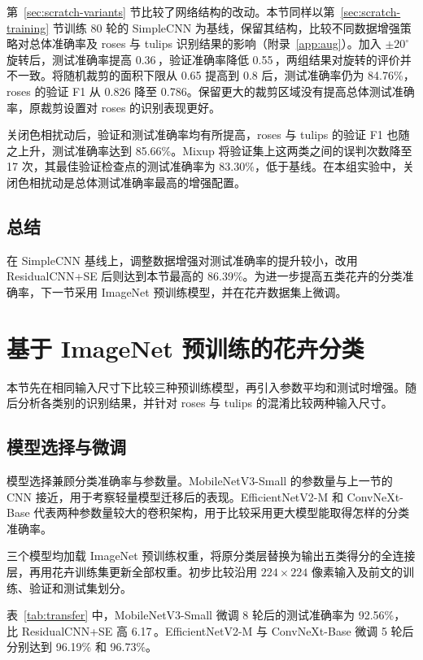 \documentclass[11pt,a4paper,UTF8,fontset=windows]{ctexart}
\newcommand{\pp}{\,\text{pp}}
\begin{document}
第~\ref{sec:scratch-variants} 节比较了网络结构的改动。本节同样以第~\ref{sec:scratch-training} 节训练 80 轮的 SimpleCNN 为基线，保留其结构，比较不同数据增强策略对总体准确率及 roses 与 tulips 识别结果的影响（附录~\ref{app:aug}）。加入 $\pm20^\circ$ 旋转后，测试准确率提高 0.36\pp，验证准确率降低 0.55\pp，两组结果对旋转的评价并不一致。将随机裁剪的面积下限从 0.65 提高到 0.8 后，测试准确率仍为 84.76\%，roses 的验证 F1 从 0.826 降至 0.786。保留更大的裁剪区域没有提高总体测试准确率，原裁剪设置对 roses 的识别表现更好。

关闭色相扰动后，验证和测试准确率均有所提高，roses 与 tulips 的验证 F1 也随之上升，测试准确率达到 85.66\%。Mixup 将验证集上这两类之间的误判次数降至 17 次，其最佳验证检查点的测试准确率为 83.30\%，低于基线。在本组实验中，关闭色相扰动是总体测试准确率最高的增强配置。

\subsection{总结}

在 SimpleCNN 基线上，调整数据增强对测试准确率的提升较小，改用 ResidualCNN+SE 后则达到本节最高的 86.39\%。为进一步提高五类花卉的分类准确率，下一节采用 ImageNet 预训练模型，并在花卉数据集上微调。

\section{基于 ImageNet 预训练的花卉分类}
\label{sec:transfer}

本节先在相同输入尺寸下比较三种预训练模型，再引入参数平均和测试时增强。随后分析各类别的识别结果，并针对 roses 与 tulips 的混淆比较两种输入尺寸。

\subsection{模型选择与微调}

模型选择兼顾分类准确率与参数量。MobileNetV3-Small 的参数量与上一节的 CNN 接近，用于考察轻量模型迁移后的表现。EfficientNetV2-M 和 ConvNeXt-Base 代表两种参数量较大的卷积架构，用于比较采用更大模型能取得怎样的分类准确率。

三个模型均加载 ImageNet 预训练权重，将原分类层替换为输出五类得分的全连接层，再用花卉训练集更新全部权重。初步比较沿用 $224\times224$ 像素输入及前文的训练、验证和测试集划分。

表~\ref{tab:transfer} 中，MobileNetV3-Small 微调 8 轮后的测试准确率为 92.56\%，比 ResidualCNN+SE 高 6.17\pp。EfficientNetV2-M 与 ConvNeXt-Base 微调 5 轮后分别达到 96.19\% 和 96.73\%。
\end{document}

